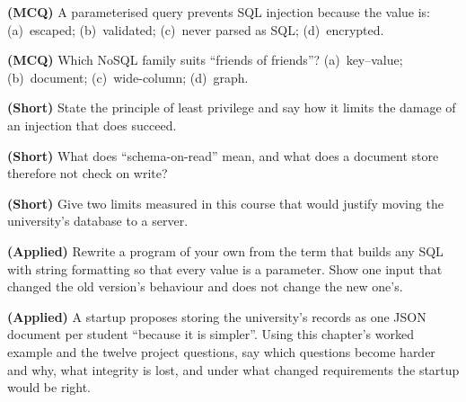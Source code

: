 \begin{reviewq}
  \item \textbf{(MCQ)} A parameterised query prevents SQL injection because
        the value is: (a)~escaped; (b)~validated; (c)~never parsed as SQL;
        (d)~encrypted.
  \item \textbf{(MCQ)} Which NoSQL family suits ``friends of friends''?
        (a)~key--value; (b)~document; (c)~wide-column; (d)~graph.
  \item \textbf{(Short)} State the principle of least privilege and say how it
        limits the damage of an injection that does succeed.
  \item \textbf{(Short)} What does ``schema-on-read'' mean, and what does a
        document store therefore not check on write?
  \item \textbf{(Short)} Give two limits measured in this course that would
        justify moving the university's database to a server.
  \item \textbf{(Applied)} Rewrite a program of your own from the term that
        builds any SQL with string formatting so that every value is a
        parameter. Show one input that changed the old version's behaviour
        and does not change the new one's.
  \item \textbf{(Applied)} A startup proposes storing the university's
        records as one JSON document per student ``because it is simpler''.
        Using this chapter's worked example and the twelve project questions,
        say which questions become harder and why, what integrity is lost, and
        under what changed requirements the startup would be right.
\end{reviewq}
